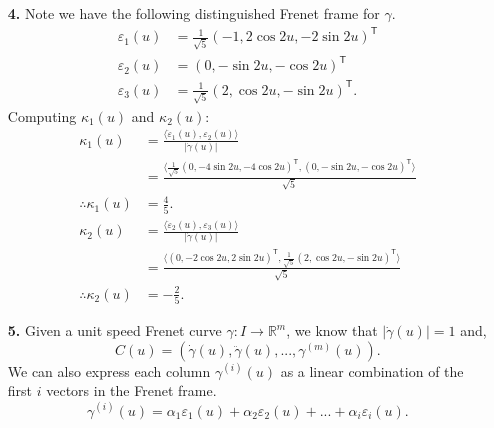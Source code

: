 \documentclass[a4paper]{article}
\newcommand{\ip}[2]{\langle #1, #2 \rangle}
\newcommand{\e}[1]{\varepsilon_{#1}(u)}
\newcommand{\dote}[1]{\dot{\varepsilon}_{#1}(u)}
\newcommand{\dotg}{\dot{\gamma}(u)}
\newcommand{\ddotg}{\ddot{\gamma}(u)}
\begin{document}
\begin{enumerate}[leftmargin=\labelsep]
\item[\textbf{4.}]
	Note we have the following distinguished Frenet frame for $\gamma$.
	\begin{align*}
		\varepsilon_1(u) & = \frac{1}{\sqrt{5}}(-1, 2\cos{2u}, -2\sin{2u})^\mathsf{T} \\
		\varepsilon_2(u) & = (0, -\sin{2u}, -\cos{2u})^{\mathsf{T}} \\
		\varepsilon_3(u) &  = \frac{1}{\sqrt{5}}(2, \cos{2u}, -\sin{2u})^\mathsf{T}.
	\end{align*}
	Computing $\kappa_1(u)$ and $\kappa_2(u)$:
	\begin{align*}
		\kappa_1(u) & = \frac{\ip{\dote{1}}{\e{2}}}{|\dotg|} \\
		& = \frac{\ip{\frac{1}{\sqrt{5}} (0, -4\sin{2u}, -4\cos{2u})^{\mathsf{T}}}{(0, -\sin{2u}, -\cos{2u})^{\mathsf{T}}}}{\sqrt{5}} \\
		\therefore \kappa_1(u) & = \frac{4}{5}. \\
		\kappa_2(u) & = \frac{\ip{\dote{2}}{\e{3}}}{|\dotg|} \\
		& = \frac{\ip{(0, -2\cos{2u}, 2\sin{2u})^{\mathsf{T}}}{\frac{1}{\sqrt{5}} (2, \cos{2u}, -\sin{2u})^{\mathsf{T}}}}{\sqrt{5}} \\
		\therefore \kappa_2(u) & = -\frac{2}{5}.
	\end{align*}

\item[\textbf{5.}]
	Given a unit speed Frenet curve $\gamma : I \rightarrow \mathbb{R}^m$, we know that $|\dotg| = 1$ and, $$C(u) = (\dotg, \ddotg, ... , \gamma^{(m)}(u)).$$
	We can also express each column $\gamma^{(i)}(u)$ as a linear combination of the first $i$ vectors in the Frenet frame. 
	$$\gamma^{(i)}(u) = \alpha_1 \e{1} + \alpha_2 \e{2} + ... + \alpha_i \e{i}.$$

\end{enumerate}
\end{document}
